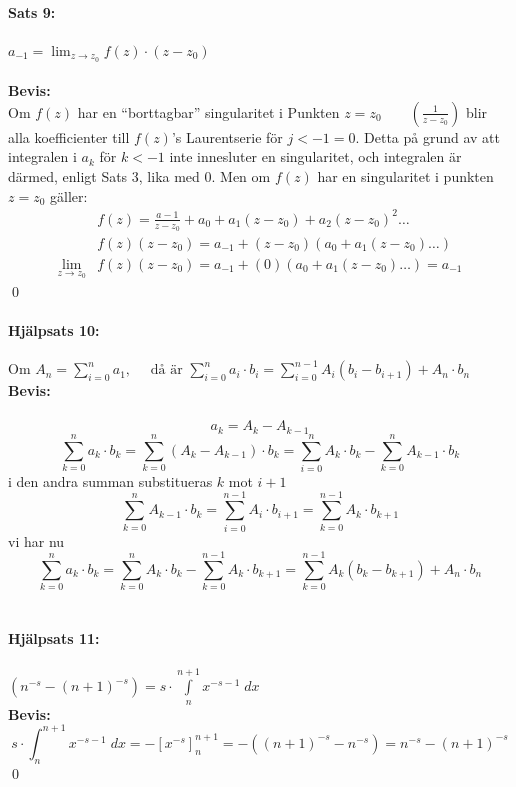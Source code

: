 \paragraph{Sats 9:} $a_{-1} = \lim_{z \to z_0} f(z) \cdot (z - z_0)$\\
\\
{\bf Bevis:}\\
Om $f(z)$ har en ``borttagbar'' singularitet i Punkten $z = z_0 \qquad \left ( \frac {1} {z - z_0} \right )$ blir 
alla koefficienter till $f(z)$'s Laurentserie för $j < -1 = 0$. Detta på grund av att integralen i $a_k$ för $k < -1$
inte innesluter en singularitet, och integralen  är därmed, enligt Sats 3, lika med $0$.
Men om $f(z)$ har en singularitet i punkten $z = z_0$ gäller:
\begin{align*}
	&f(z) = \frac {a - 1} {z - z_0} + a_0 + a_1(z - z_0) + a_2(z - z_0)^2 \ldots \\
	&f(z) (z - z_0) = a_{-1} + (z - z_0)(a_0 + a_1 (z - z_0) \ldots ) \\
	\lim_{z \to z_0} &f(z)(z - z_0) = a_{- 1} + (0)(a_0 + a_1(z - z_0) \ldots ) = a_{-1}
\end{align*}
\hfill \qed
\\
\paragraph{Hjälpsats 10:} %
Om $A_n = \sum\limits_{i = 0}^n a_1, \quad \text{ då är } \sum\limits_{i = 0}^n a_i \cdot b_i = 
		\sum\limits_{i = 0}^{n - 1} A_i (b_i - b_{i + 1}) + A_n \cdot b_n$\\
{\bf Bevis:}\\
\\
\[ a_k = A_k - A_{k - 1} \]
\[
	\sum_{k = 0}^n a_k \cdot b_k =  \sum_{k = 0}^n (A_k - A_{k - 1}) \cdot b_k = \sum_{i = 0}^n A_k \cdot b_k - 
		\sum_{k = 0}^n A_{k - 1} \cdot b_k
\]
i den andra summan substitueras $k$ mot $i + 1$
\[
	\sum_{k = 0}^n A_{k - 1} \cdot b_k = \sum_{i = 0}^{n - 1} A_i \cdot b_{i + 1} = \sum_{k = 0}^{n - 1} A_k \cdot b_{k + 1}
\]
vi har nu
\[
	\sum_{k = 0}^n a_k \cdot b_k = \sum_{k = 0}^n A_k \cdot b_k - \sum_{k = 0}^{n - 1} A_k \cdot b_{k + 1} =
		\sum_{k = 0}^{n - 1} A_k (b_k - b_{k + 1}) + A_n \cdot b_n
\]
\\
\paragraph{Hjälpsats 11:} $(n^{-s} - (n + 1)^{-s}) = s \cdot \int\limits_n^{n + 1} x^{-s - 1} \; dx$\\
{\bf Bevis:}\\
\[
	s \cdot \int_n^{n + 1} x^{-s - 1} \; dx = - [ x^{-s} ]_n^{n + 1} = - ((n + 1)^{-s} - n^{-s})
		= n^{-s} -(n + 1)^{-s}
\]
\hfill \qed
\\
